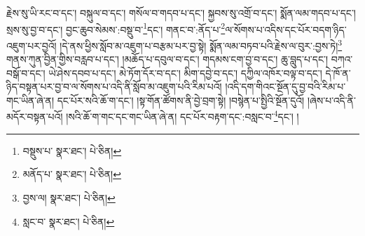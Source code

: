 རྗེས་སུ་ཡི་རང་བ་དང་། བསྐུལ་བ་དང་། གསོལ་བ་གདབ་པ་དང་། སྐྱབས་སུ་འགྲོ་བ་དང་། སྨོན་ལམ་གདབ་པ་དང་། སྲས་སུ་བྱ་བ་དང་། བྱང་ཆུབ་སེམས་:བསྡུ་བ་\footnote{བསྡུས་པ་  སྣར་ཐང་།  པེ་ཅིན། }དང་། གནང་བ་:ནོད་པ་\footnote{མནོད་པ་  སྣར་ཐང་།  པེ་ཅིན། }ལ་སོགས་པ་འདིས་དང་པོར་བདག་ཉིད་འཇུག་པར་བྱའོ། །དེ་ནས་ཕྱིས་སློབ་མ་འཇུག་པ་བརྩམ་པར་བྱ་སྟེ། སྨོན་ལམ་བཏབ་པའི་རྗེས་ལ་བུར་:བྱས་ཏེ།\footnote{བྱས་ལ།  སྣར་ཐང་།  པེ་ཅིན། } གནས་ཀུན་བྱིན་གྱིས་བརླབ་པ་དང་། །མཆོད་པ་དབུལ་བ་དང་། གདམས་ངག་བྱ་བ་དང་། ཆུ་བླུད་པ་དང་། བཀའ་བསྒོ་བ་དང་། ཡེ་ཤེས་དབབ་པ་དང་། མེ་ཏོག་དོར་བ་དང་། མིག་དབྱེ་བ་དང་། དཀྱིལ་འཁོར་བལྟ་བ་དང་། དེ་ཁོ་ན་ཉིད་བསྟན་པར་བྱ་བ་ལ་སོགས་པ་འདི་ནི་སློབ་མ་འཇུག་པའི་རིམ་པའོ། །འདི་དག་གིའང་སྔོན་དུ་བྱ་བའི་རིམ་པ་གང་ཡིན་ཞེ་ན། དང་པོར་སའི་ཆོ་ག་དང་། །སྟ་གོན་ཚོགས་ནི་བྱེ་བྲག་སྟེ། །བསྙེན་པ་སྤྱིའི་སྔོན་དུའོ། །ཞེས་པ་འདི་ནི་མདོར་བསྟན་པའོ། །སའི་ཆོ་ག་གང་དང་གང་ཡིན་ཞེ་ན། དང་པོར་བརྟག་དང་:བསླང་བ་\footnote{སླང་བ་  སྣར་ཐང་།  པེ་ཅིན། }དང་། །
